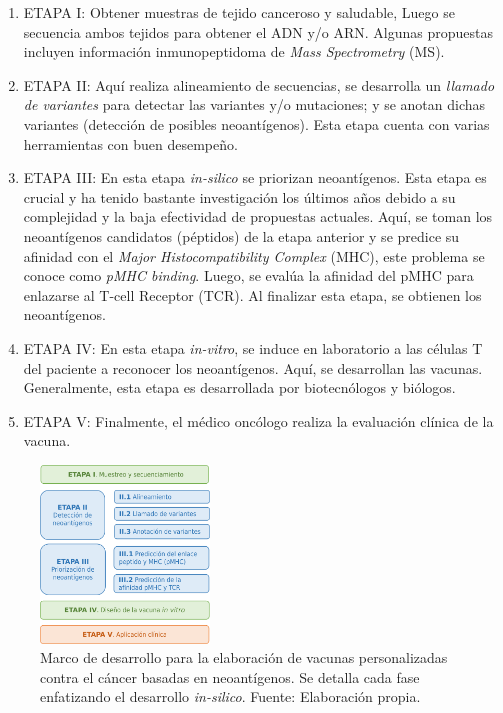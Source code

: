 \documentclass[a4paper,11pt]{article}
\begin{document}
	
	\begin{enumerate}
		\item ETAPA I: Obtener muestras de tejido canceroso y saludable, Luego se secuencia ambos tejidos para obtener el ADN y/o ARN. Algunas propuestas incluyen información inmunopeptidoma de \textit{Mass Spectrometry} (MS).
		\item ETAPA II: Aquí realiza alineamiento de secuencias, se desarrolla un \textit{llamado de variantes} para detectar las variantes y/o mutaciones; y se anotan dichas variantes (detección de posibles neoantígenos). Esta etapa cuenta con varias herramientas con buen desempeño.
		\item ETAPA III: En esta etapa \textit{in-silico} se priorizan neoantígenos. Esta etapa es crucial y ha tenido bastante investigación los últimos años debido a su complejidad y la baja efectividad de propuestas actuales. Aquí, se toman los neoantígenos candidatos (péptidos) de la etapa anterior y se predice su afinidad con el \textit{Major Histocompatibility Complex} (MHC), este problema se conoce como \textit{pMHC binding}. Luego, se  evalúa la afinidad del pMHC para enlazarse al T-cell Receptor (TCR). Al finalizar esta etapa, se obtienen los neoantígenos.
		\item ETAPA IV: En esta etapa \textit{in-vitro}, se induce en laboratorio  a las células T del paciente a reconocer los neoantígenos. Aquí, se desarrollan las vacunas. Generalmente, esta etapa es desarrollada por biotecnólogos y biólogos.
		\item ETAPA V: Finalmente, el médico oncólogo realiza la evaluación clínica de la vacuna.
	\end{enumerate}
	
	
	
	
	
	
	


\begin{figure}[h]	
		\centering
		\includegraphics[width=0.4\textwidth]{../img/vaccines/pipeline2}	
	\caption{Marco de desarrollo para la elaboración de vacunas personalizadas contra el cáncer basadas en neoantígenos. Se detalla cada fase enfatizando el desarrollo \textit{in-silico}. Fuente: Elaboración propia.}
	\label{fig:vaccines}
\end{figure}
	
\end{document}
